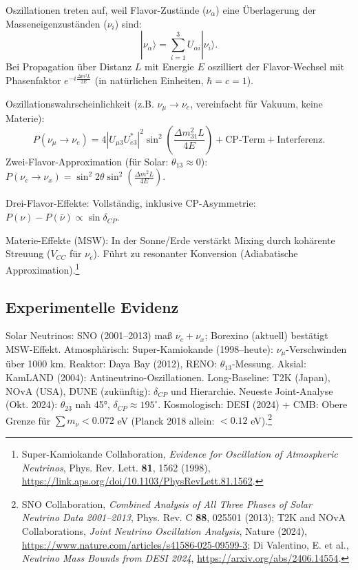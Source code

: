 	Oszillationen treten auf, weil Flavor-Zustände ($\nu_\alpha$) eine Überlagerung der Masseneigenzuständen ($\nu_i$) sind:
	\begin{equation}
		|\nu_\alpha\rangle = \sum_{i=1}^3 U_{\alpha i} |\nu_i\rangle.
		\label{eq:flavorueberlagerung}
	\end{equation}
	Bei Propagation über Distanz $L$ mit Energie $E$ oszilliert der Flavor-Wechsel mit Phasenfaktor $ e^{-i \frac{\Delta m^2 L}{2E}} $ (in natürlichen Einheiten, $\hbar=c=1$).
	
	Oszillationswahrscheinlichkeit (z.B. $\nu_\mu \to \nu_e$, vereinfacht für Vakuum, keine Materie):
	\begin{equation}
		P(\nu_\mu \to \nu_e) = 4 |U_{\mu 3} U_{e 3}^*|^2 \sin^2 \left( \frac{\Delta m_{31}^2 L}{4E} \right) + \text{CP-Term} + \text{Interferenz}.
		\label{eq:oszprob}
	\end{equation}
	Zwei-Flavor-Approximation (für Solar: $\theta_{13}\approx0$): $ P(\nu_e \to \nu_x) = \sin^2 2\theta \sin^2 \left( \frac{\Delta m^2 L}{4E} \right) $.
	
	Drei-Flavor-Effekte: Vollständig, inklusive CP-Asymmetrie: $ P(\nu) - P(\bar{\nu}) \propto \sin \delta_{CP} $.
	
	Materie-Effekte (MSW): In der Sonne/Erde verstärkt Mixing durch kohärente Streuung ($V_{CC}$ für $\nu_e$). Führt zu resonanter Konversion (Adiabatische Approximation).\footnote{Super-Kamiokande Collaboration, \emph{Evidence for Oscillation of Atmospheric Neutrinos}, Phys. Rev. Lett. \textbf{81}, 1562 (1998), \url{https://link.aps.org/doi/10.1103/PhysRevLett.81.1562}.}
	
	\subsection{Experimentelle Evidenz}
	
	Solar Neutrinos: SNO (2001--2013) maß $\nu_e + \nu_x$; Borexino (aktuell) bestätigt MSW-Effekt. Atmosphärisch: Super-Kamiokande (1998--heute): $\nu_\mu$-Verschwinden über 1000 km. Reaktor: Daya Bay (2012), RENO: $\theta_{13}$-Messung. Aksial: KamLAND (2004): Antineutrino-Oszillationen. Long-Baseline: T2K (Japan), NOvA (USA), DUNE (zukünftig): $\delta_{CP}$ und Hierarchie. Neueste Joint-Analyse (Okt. 2024): $\theta_{23}$ nah 45°, $\delta_{CP} \approx 195^\circ$. Kosmologisch: DESI (2024) + CMB: Obere Grenze für $\sum m_\nu < 0.072$ eV (Planck 2018 allein: $< 0.12$ eV).\footnote{SNO Collaboration, \emph{Combined Analysis of All Three Phases of Solar Neutrino Data 2001--2013}, Phys. Rev. C \textbf{88}, 025501 (2013); T2K and NOvA Collaborations, \emph{Joint Neutrino Oscillation Analysis}, Nature (2024), \url{https://www.nature.com/articles/s41586-025-09599-3}; Di Valentino, E. et al., \emph{Neutrino Mass Bounds from DESI 2024}, \url{https://arxiv.org/abs/2406.14554}.}
	
